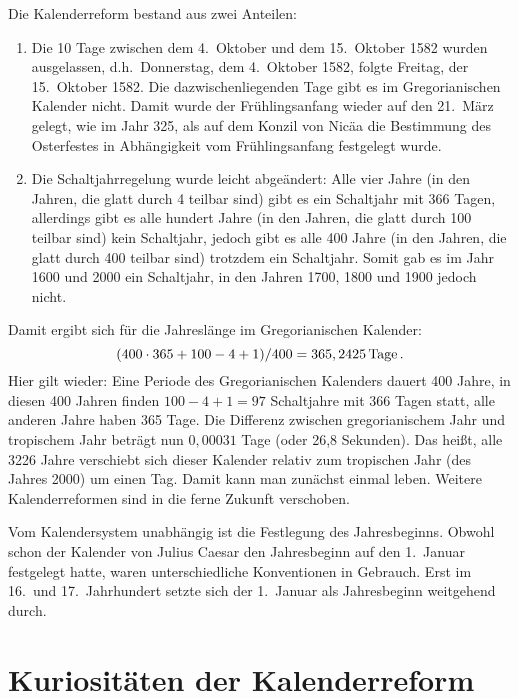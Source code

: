 Die Kalenderreform bestand aus zwei Anteilen:
\begin{enumerate}
\item
Die 10 Tage zwischen dem 4.\ Oktober und dem 15.\ Oktober 1582 wurden ausgelassen, d.h.\ Donnerstag, 
dem 4.\ Oktober 1582, folgte Freitag, der 15.\ Oktober 1582. Die dazwischenliegenden Tage gibt es im 
Gregorianischen Kalender nicht. Damit wurde der Fr\"uhlingsanfang wieder auf den 21.\ M\"arz gelegt, 
wie im Jahr 325, als auf dem Konzil von Nic\"aa die Bestimmung des Osterfestes in Abh\"angigkeit vom 
Fr\"uhlingsanfang festgelegt wurde.  
\item
Die Schaltjahrregelung 
wurde leicht abge\"andert: Alle vier Jahre (in den Jahren, die glatt durch 4
teilbar sind) gibt es ein Schaltjahr mit 366 Tagen, allerdings gibt es alle hundert Jahre (in den Jahren, die
glatt durch 100 teilbar sind) kein Schaltjahr, jedoch gibt es alle 400 Jahre (in den Jahren, die glatt
durch 400 teilbar sind) trotzdem ein Schaltjahr. Somit gab es im Jahr 1600 und 2000 ein Schaltjahr,
in den Jahren 1700, 1800 und 1900 jedoch nicht.   
\end{enumerate}
Damit ergibt sich f\"ur die Jahresl\"ange im Gregorianischen Kalender:
\begin{equation}
          (400 \cdot 365 + 100 - 4 + 1)/400 =  365,2425  \, {\rm Tage} \, .
\end{equation}
Hier gilt wieder: Eine Periode des Gregorianischen Kalenders dauert 400 Jahre, in diesen 400 Jahren
finden $100 - 4 + 1=97$ Schaltjahre mit 366 Tagen statt, alle anderen Jahre haben 365 Tage. Die 
Differenz zwischen gregorianischem Jahr und tropischem Jahr betr\"agt nun $0,00031$ Tage (oder
26,8 Sekunden). Das hei\ss t,
alle 3226 Jahre verschiebt sich dieser Kalender relativ zum tropischen Jahr (des Jahres 2000) um einen
Tag. Damit kann man zun\"achst einmal leben. Weitere Kalenderreformen sind in die ferne Zukunft verschoben.

Vom Kalendersystem unabh\"angig ist die Festlegung des Jahresbeginns. Obwohl schon der Kalender
von Julius Caesar den Jahresbeginn auf den 1.\ Januar festgelegt hatte, waren unterschiedliche
Konventionen in Gebrauch. Erst im 16.\ und 17.\ Jahrhundert setzte sich der 1.\ Januar als Jahresbeginn
weitgehend durch.


\section{Kuriosit\"aten der Kalenderreform}


